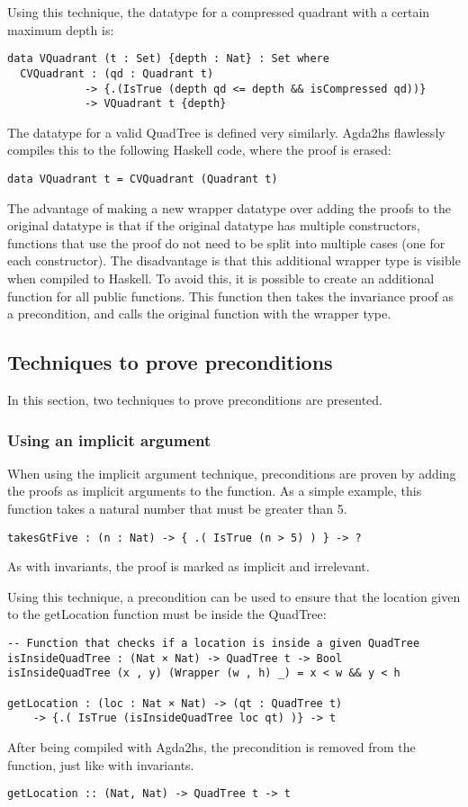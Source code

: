Using this technique, the datatype for a compressed quadrant with a certain maximum depth is: 
\begin{verbatim}
data VQuadrant (t : Set) {depth : Nat} : Set where
  CVQuadrant : (qd : Quadrant t) 
            -> {.(IsTrue (depth qd <= depth && isCompressed qd))} 
            -> VQuadrant t {depth}
\end{verbatim}
The datatype for a valid QuadTree is defined very similarly. Agda2hs flawlessly compiles this to the following Haskell code, where the proof is erased:
\begin{verbatim}
data VQuadrant t = CVQuadrant (Quadrant t)
\end{verbatim}

The advantage of making a new wrapper datatype over adding the proofs to the original datatype is that if the original datatype has multiple constructors, functions that use the proof do not need to be split into multiple cases (one for each constructor). The disadvantage is that this additional wrapper type is visible when compiled to Haskell. To avoid this, it is possible to create an additional function for all public functions. This function then takes the invariance proof as a precondition, and calls the original function with the wrapper type. 

\subsection{Techniques to prove preconditions}
In this section, two techniques to prove preconditions are presented.

\subsubsection{Using an implicit argument} \label{using_implicit}
When using the implicit argument technique, preconditions are proven by adding the proofs as implicit arguments to the function.
As a simple example, this function takes a natural number that must be greater than 5.
\begin{verbatim}
takesGtFive : (n : Nat) -> { .( IsTrue (n > 5) ) } -> ?
\end{verbatim}
As with invariants, the proof is marked as implicit and irrelevant. 

Using this technique, a precondition can be used to ensure that the location given to the getLocation function must be inside the QuadTree:
\begin{verbatim}
-- Function that checks if a location is inside a given QuadTree
isInsideQuadTree : (Nat × Nat) -> QuadTree t -> Bool
isInsideQuadTree (x , y) (Wrapper (w , h) _) = x < w && y < h

getLocation : (loc : Nat × Nat) -> (qt : QuadTree t) 
    -> {.( IsTrue (isInsideQuadTree loc qt) )} -> t
\end{verbatim}
After being compiled with Agda2hs, the precondition is removed from the function, just like with invariants.
\begin{verbatim}
getLocation :: (Nat, Nat) -> QuadTree t -> t
\end{verbatim}

